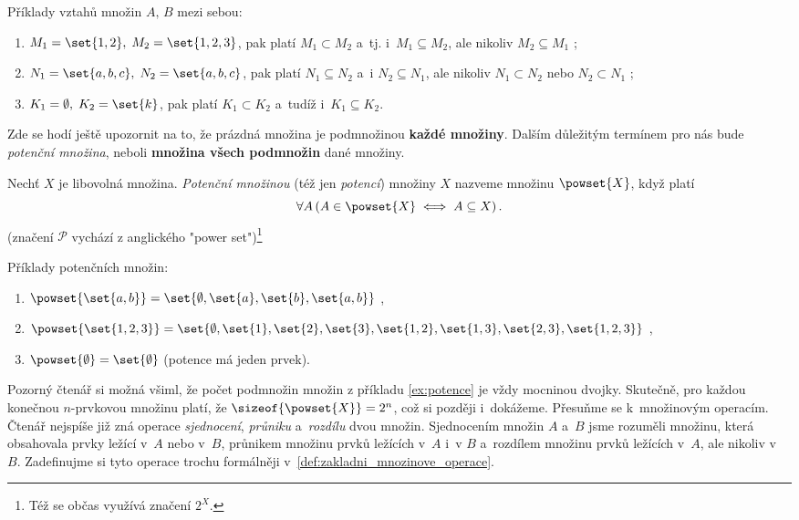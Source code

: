 \begin{example}
    Příklady vztahů množin $A,\,B$ mezi sebou:
    \begin{enumerate}[label=(\roman*)]
        \item $M_1=\set{1,2},\; M_2=\set{1,2,3}$, pak platí $M_1 \subset M_2$ a~tj. i~$M_1 \subseteq M_2$, ale nikoliv $M_2 \subseteq M_1$ ;
        \item $N_1=\set{a,b,c},\; N_2=\set{a,b,c}$, pak platí $N_1 \subseteq N_2$ a~i $N_2 \subseteq N_1$, ale nikoliv $N_1 \subset N_2$ nebo $N_2 \subset N_1$ ;
        \item $K_1=\emptyset,\; K_2=\set{k}$, pak platí $K_1 \subset K_2$ a~tudíž i~$K_1 \subseteq K_2$.
    \end{enumerate}
\end{example}
Zde se hodí ještě upozornit na to, že prázdná množina je podmnožinou \textbf{každé množiny}. Dalším důležitým termínem pro nás bude \emph{potenční množina}, neboli \textbf{množina všech podmnožin} dané množiny.
\begin{definition}\label{def:potence}
    Nechť $X$ je libovolná množina. \emph{Potenční množinou} (též jen \emph{potencí}) množiny $X$ nazveme množinu $\powset{X}$, když platí
    \begin{equation*}
        \forall A \left(A \in \powset{X} \iff A \subseteq X\right).
    \end{equation*}
    (značení $\mathcal{P}$ vychází z anglického "power set")\footnote{Též se občas využívá značení $2^{X}$.}
\end{definition} 
\begin{example}\label{ex:potence}
    Příklady potenčních množin:
    \begin{enumerate}[label=(\roman*)]
        \item $\powset{\set{a,b}}=\set{\emptyset,\set{a},\set{b},\set{a,b}}$ ,
        \item $\powset{\set{1,2,3}}=\set{\emptyset,\set{1},\set{2},\set{3},\set{1,2},\set{1,3},\set{2,3},\set{1,2,3}}$ ,
        \item $\powset{\emptyset}=\set{\emptyset}$ (potence má jeden prvek).
    \end{enumerate}
\end{example}
Pozorný čtenář si možná všiml, že počet podmnožin množin z příkladu \ref{ex:potence} je vždy mocninou dvojky. Skutečně, pro každou konečnou $n$-prvkovou množinu platí, že $\sizeof{\powset{X}}=2^n$, což si později i~dokážeme.
Přesuňme se k~množinovým operacím. Čtenář nejspíše již zná operace \emph{sjednocení}, \emph{průniku} a~\emph{rozdílu} dvou množin. Sjednocením množin $A$ a~$B$ jsme rozuměli množinu, která obsahovala prvky ležící v~$A$ nebo v~$B$, průnikem množinu prvků ležících v~$A$ i~v $B$ a~rozdílem množinu prvků ležících v~$A$, ale nikoliv v~$B$. Zadefinujme si tyto operace trochu formálněji v~\ref{def:zakladni_mnozinove_operace}. 
